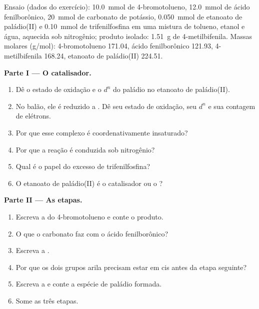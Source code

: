 \begin{problem}
\label{pb:b2:catalytic-cycles:1}
Ensaio (dados do exercício): \qty{10.0}{mmol} de 4-bromotolueno, \qty{12.0}{mmol} de
ácido fenilborônico, \qty{20}{mmol} de carbonato de potássio, \qty{0.050}{mmol} de
etanoato de paládio(II) e \qty{0.10}{mmol} de trifenilfosfina em uma mistura de
tolueno, etanol e água, aquecida sob nitrogênio; produto isolado: \qty{1.51}{g}
de 4-metilbifenila. Massas molares (\unit{g/mol}): 4-bromotolueno 171.04, ácido
fenilborônico 121.93, 4-metilbifenila 168.24, etanoato de paládio(II) 224.51.

\medskip
\noindent\textbf{Parte I --- O catalisador.}
\begin{enumerate}
  \item Dê o estado de oxidação e o $d^n$ do paládio no etanoato de paládio(II).
  \item No balão, ele é reduzido a . Dê seu estado de oxidação, seu
        $d^n$ e sua contagem de elétrons.
  \item Por que esse complexo é coordenativamente insaturado?
  \item Por que a reação é conduzida sob nitrogênio?
  \item Qual é o papel do excesso de trifenilfosfina?
  \item O etanoato de paládio(II) é o catalisador ou o ?
\end{enumerate}

\medskip
\noindent\textbf{Parte II --- As etapas.}
\begin{enumerate}[resume]
  \item Escreva a  do 4-bromotolueno e conte o produto.
  \item O que o carbonato faz com o ácido fenilborônico?
  \item Escreva a .
  \item Por que os dois grupos arila precisam estar em cis antes da etapa seguinte?
  \item Escreva a  e conte a espécie de paládio formada.
  \item Some as três etapas.
\end{enumerate}


\end{problem}
